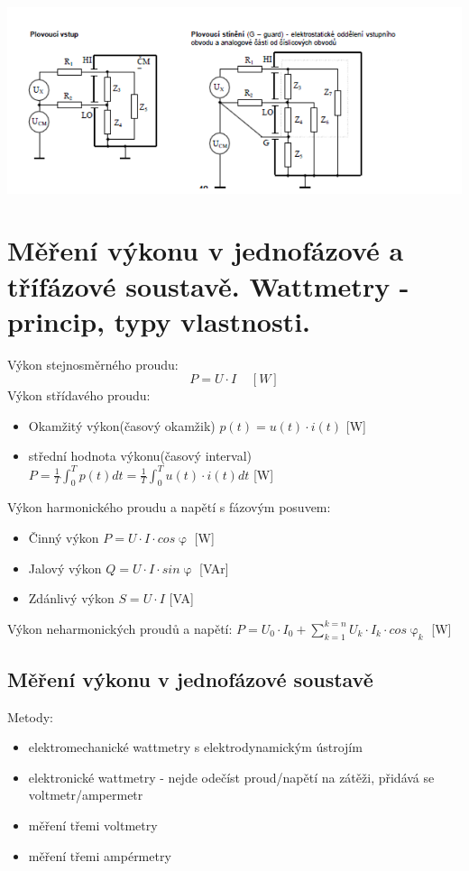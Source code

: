 \includegraphics{images/ruseni.png}
\newpage

\section{Měření výkonu v jednofázové a třífázové soustavě. Wattmetry - princip, typy vlastnosti.}
Výkon stejnosměrného proudu:
\begin{equation}
    P = U\cdot I \;\;\;\; [W]
\end{equation}
Výkon střídavého proudu:
\begin{itemize}
    \item Okamžitý výkon(časový okamžik) $p(t) = u(t)\cdot i(t)$   [W]
    \item střední hodnota výkonu(časový interval) $P = \frac{1}{T}\int_0^Tp(t)dt = \frac{1}{T}\int_0^Tu(t)\cdot i(t)dt$    [W]
\end{itemize}

Výkon harmonického proudu a napětí s fázovým posuvem:
\begin{itemize}
    \item Činný výkon    $P = U\cdot I \cdot cos \upvarphi $    [W]
    \item Jalový výkon   $Q = U\cdot I \cdot sin \upvarphi $    [VAr]
    \item Zdánlivý výkon  $S = U \cdot I$                     [VA]
\end{itemize}
Výkon neharmonických proudů a napětí: $P = U_0\cdot I_0 + \sum^{k=n}_{k=1}U_k\cdot I_k \cdot cos \upvarphi_k$     [W]
\subsection*{Měření výkonu v jednofázové soustavě}
Metody:
\begin{itemize}
    \item elektromechanické wattmetry s elektrodynamickým ústrojím
    \item elektronické wattmetry - nejde odečíst proud/napětí na zátěži, přidává se voltmetr/ampermetr
    \item měření třemi voltmetry
    \item měření třemi ampérmetry
\end{itemize}

